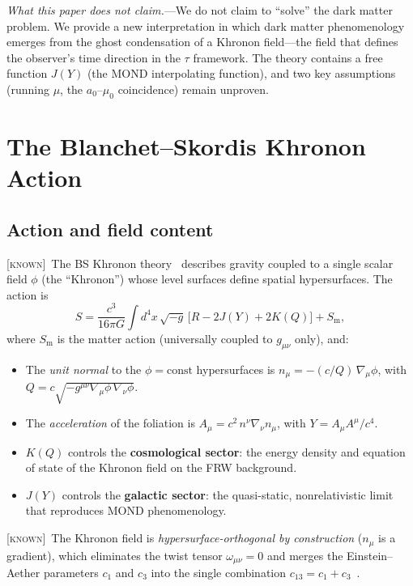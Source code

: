 \documentclass[prd,twocolumn,superscriptaddress,longbibliography,floatfix]{revtex4-2}
\newcommand{\tauasym}{\tau}
\newcommand{\known}{\textsc{[known]}}
\begin{document}
\emph{What this paper does not claim.}---We do not claim to
``solve'' the dark matter problem.  We provide a new interpretation
in which dark matter phenomenology emerges from the ghost
condensation of a Khronon field---the field that defines the
observer's time direction in the $\tauasym$ framework.  The theory
contains a free function $J(Y)$ (the MOND interpolating function),
and two key assumptions (running $\mu$, the $a_0$--$\mu_0$
coincidence) remain unproven.


\section{The Blanchet--Skordis Khronon Action}
\label{sec:action}

\subsection{Action and field content}

\known\  The BS Khronon theory~\cite{BS2024,BS2025} describes
gravity coupled to a single scalar field $\phi$ (the ``Khronon'')
whose level surfaces define spatial hypersurfaces.  The action is
\begin{equation}
S = \frac{c^3}{16\pi G}\int\!d^4x\,\sqrt{-g}\,
\big[R - 2J(Y) + 2K(Q)\big] + S_{\mathrm{m}},
\label{eq:action}
\end{equation}
where $S_{\mathrm{m}}$ is the matter action (universally coupled
to $g_{\mu\nu}$ only), and:
\begin{itemize}
\item The \emph{unit normal} to the $\phi = \mathrm{const}$
  hypersurfaces is
  $n_\mu = -(c/Q)\,\nabla_\mu\phi$, with
  $Q = c\sqrt{-g^{\mu\nu}\nabla_\mu\phi\,\nabla_\nu\phi}$.
\item The \emph{acceleration} of the foliation is
  $A_\mu = c^2\,n^\nu\nabla_\nu n_\mu$, with
  $Y = A_\mu A^\mu / c^4$.
\item $K(Q)$ controls the \textbf{cosmological sector}:
  the energy density and equation of state of the Khronon field
  on the FRW background.
\item $J(Y)$ controls the \textbf{galactic sector}:
  the quasi-static, nonrelativistic limit that reproduces
  MOND phenomenology.
\end{itemize}

\known\  The Khronon field is \emph{hypersurface-orthogonal by
construction} ($n_\mu$ is a gradient), which eliminates the twist
tensor $\omega_{\mu\nu} = 0$ and merges the Einstein--Aether
parameters $c_1$ and $c_3$ into the single combination
$c_{13} = c_1 + c_3$~\cite{Jacobson2010,BPS2010,Horava2009}.
\end{document}
